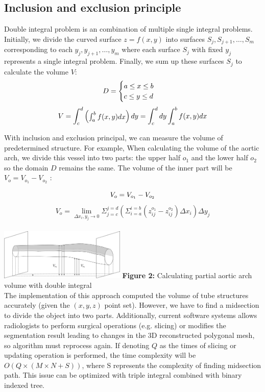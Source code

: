 \documentclass[11pt]{article}
\begin{document}
\begin{multicols}{2}
\subsection{Inclusion and exclusion principle}
Double integral problem is an combination of multiple single integral problems. Initially, we divide the curved surface $z=f(x,y)$ into surfaces $S_j, S_{j+1}, \dots, S_m$ corresponding to each $y_j,  y_{j+1}, \dots, y_m$ where each surface $S_j$ with fixed $y_j$ represents a single integral problem. Finally, we sum up these surfaces $S_j$ to calculate the volume $V$: 
$$
D = \begin{cases} a \leq x \leq b \\ c \leq y \leq d \end{cases} \\
$$
$$
V =  \int_{c}^{d} \begin{pmatrix} \int_{a}^{b} f(x,y)dx \end{pmatrix} dy = \int_{c}^{d} dy \int_{a}^{b} f(x,y)dx \space
$$

With inclusion and exclusion principal, we can measure the volume of predetermined structure. For example, When calculating the volume of the aortic arch, we divide this vessel into two parts: the upper half $o_1$ and the lower half $o_2$ so the domain $D$ remains the same. The volume of the inner part will be $V_o = V_{o_1} - V_{o_2}$ :

$$
V_o = V_{o_1} - V_{o_2} \\
$$
$$
V_o = \lim_{\Delta x_i, y_j \rightarrow 0} \Sigma_{j=c}^{j=d} (\Sigma_{i=a}^{i=b} (z^{o_1}_{ij} - z^{o_2}_{ij}) \Delta x_i) \Delta y_j
$$ \\

\includegraphics[width=0.45\textwidth]{Figures/Exclusion.png}
\textbf{Figure 2:} Calculating partial aortic arch volume with double integral \\

The implementation of this approach computed the volume of tube structures accurately (given the $(x,y,z)$ point set). However, we have to find a midsection to divide the object into two parts. Additionally, current software systems \cite{vascular} allows radiologists to perform surgical operations (e.g. slicing) or modifies the segmentation result leading to changes in the 3D reconstructed polygonal mesh, so algorithm must reprocess again. If denoting $Q$ as the times of slicing or updating operation is performed, the time complexity will be $O (Q \times (M \times N + S))$, where S represents the complexity of finding midsection path. This issue can be optimized with triple integral combined with binary indexed tree.


\end{multicols}
\end{document}
